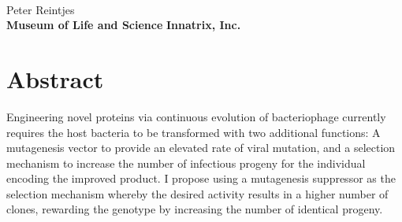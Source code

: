 \documentclass[10pt,letterpaper]{article}
\date{}
\begin{document}
\vspace*{0.2in}

\begin{flushleft}
{\Large
\textbf{} %
}
\newline
\\
Peter Reintjes%
\\
\bigskip
\textbf{Museum of Life and Science}
\newline
\bigskip
\textbf{Innatrix, Inc.}
\bigskip

% 
%






\end{flushleft}
\section*{Abstract}
Engineering novel proteins via continuous evolution of bacteriophage currently requires the host bacteria to be transformed with two additional functions: A mutagenesis vector to provide an elevated rate of viral mutation, and a selection mechanism to increase the number of infectious progeny for the individual encoding the improved product\cite{pace}.  I propose using a mutagenesis suppressor as the selection mechanism whereby the desired activity results in a higher number of clones, rewarding the genotype by increasing the number of identical progeny.
\end{document}

